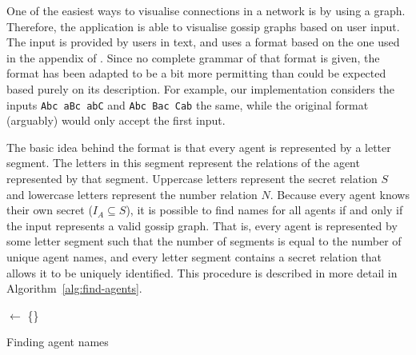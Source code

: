 One of the easiest ways to visualise connections in a network is by using a graph.
Therefore, the application is able to visualise gossip graphs based on user input.
The input is provided by users in text, and uses a format based on the one used in the appendix of \textcite{van_ditmarsch_strengthening_2019}.
Since no complete grammar of that format is given,
the format has been adapted to be a bit more permitting than could be expected based purely on its description.
For example, our implementation considers the inputs \texttt{Abc aBc abC} and \texttt{Abc Bac Cab} the same, while the original format (arguably) would only accept the first input.

The basic idea behind the format is that every agent is represented by a letter segment.
The letters in this segment represent the relations of the agent represented by that segment.
Uppercase letters represent the secret relation \(S\) and lowercase letters represent the number relation \(N\).
Because every agent knows their own secret (\(I_A \subseteq S\)), it is possible to find names for all agents if and only if the input represents a valid gossip graph.
That is, every agent is represented by some letter segment such that the number of segments is equal to the number of unique agent names, and every letter segment contains a secret relation that allows it to be uniquely identified.
This procedure is described in more detail in Algorithm~\ref{alg:find-agents}.

\begin{algorithm*}
    \DontPrintSemicolon

    \Names $\leftarrow$ \{\}\;
    \BlankLine
    \Return{\Names}\;
    \caption{Finding agent names}\label{alg:find-agents}
\end{algorithm*}

